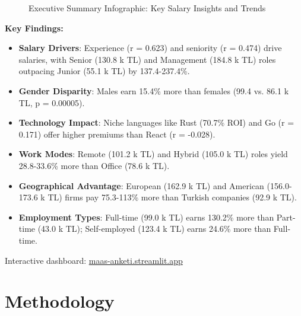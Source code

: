 \documentclass[12pt,a4paper]{article}
\begin{document}
\begin{figure}[H]
    \caption{Executive Summary Infographic: Key Salary Insights and Trends}
\end{figure}

\textbf{Key Findings:}
\begin{itemize}
    \item \textbf{Salary Drivers}: Experience (r = 0.623) and seniority (r = 0.474) drive salaries, with Senior (130.8 k TL) and Management (184.8 k TL) roles outpacing Junior (55.1 k TL) by 137.4-237.4\%.
    \item \textbf{Gender Disparity}: Males earn 15.4\% more than females (99.4 vs. 86.1 k TL, p = 0.00005).
    \item \textbf{Technology Impact}: Niche languages like Rust (70.7\% ROI) and Go (r = 0.171) offer higher premiums than React (r = -0.028).
    \item \textbf{Work Modes}: Remote (101.2 k TL) and Hybrid (105.0 k TL) roles yield 28.8-33.6\% more than Office (78.6 k TL).
    \item \textbf{Geographical Advantage}: European (162.9 k TL) and American (156.0-173.6 k TL) firms pay 75.3-113\% more than Turkish companies (92.9 k TL).
    \item \textbf{Employment Types}: Full-time (99.0 k TL) earns 130.2\% more than Part-time (43.0 k TL); Self-employed (123.4 k TL) earns 24.6\% more than Full-time.
\end{itemize}

Interactive dashboard: \href{https://maas-anketi.streamlit.app/}{maas-anketi.streamlit.app}

\section{Methodology}
\end{document}
